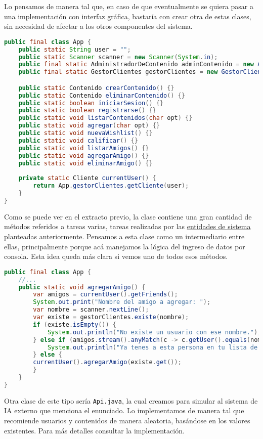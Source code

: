 Lo pensamos de manera tal que, en caso de que eventualmente se quiera pasar a una implementación con interfaz gráfica, 
bastaría con crear otra de estas clases, sin necesidad de afectar a los otros componentes del sistema.
\begin{lstlisting}[language=Java, caption={Vistazo de la clase principal del sistema.}]
public final class App {
    public static String user = "";
    public static Scanner scanner = new Scanner(System.in);
    public final static AdministradorDeContenido adminContenido = new AdministradorDeContenido(new PlataformaCentral());
    public final static GestorClientes gestorClientes = new GestorClientes();

    public static Contenido crearContenido() {}
    public static Contenido eliminarContenido() {}
    public static boolean iniciarSesion() {}
    public static boolean registrarse() {}
    public static void listarContenidos(char opt) {}
    public static void agregar(char opt) {}
    public static void nuevaWishlist() {}
    public static void calificar() {}
    public static void listarAmigos() {}
    public static void agregarAmigo() {}
    public static void eliminarAmigo() {}
    
    private static Cliente currentUser() {
        return App.gestorClientes.getCliente(user);
    }
}
\end{lstlisting}
Como se puede ver en el extracto previo, la clase contiene una gran cantidad de métodos referidos a tareas varias, tareas
realizadas por las \hyperlink{entidades-sistema}{entidades de sistema} planteadas anteriormente.
Pensamos a esta clase como un intermediario entre ellas, principalmente porque acá manejamos la lógica del ingreso de
datos por consola.
Esta idea queda más clara si vemos uno de todos esos métodos.
\begin{lstlisting}[language=Java, caption={Vistazo de uno de los métodos referidos al ingreso de datos.}]
public final class App {
    //...
    public static void agregarAmigo() {
        var amigos = currentUser().getFriends();
        System.out.print("Nombre del amigo a agregar: ");
        var nombre = scanner.nextLine();
        var existe = gestorClientes.existe(nombre);
        if (existe.isEmpty()) {
            System.out.println("No existe un usuario con ese nombre.");
        } else if (amigos.stream().anyMatch(c -> c.getUser().equals(nombre))) {
            System.out.println("Ya tenes a esta persona en tu lista de amigos.");
        } else {
        currentUser().agregarAmigo(existe.get());
        }
    }
}
\end{lstlisting}
Otra clase de este tipo sería \lstinline|Api.java|, la cual creamos para simular al sistema de IA externo que menciona
el enunciado. 
Lo implementamos de manera tal que recomiende usuarios y contenidos de manera aleatoria, basándose en los valores 
existentes.
Para más detalles consultar la implementación.

